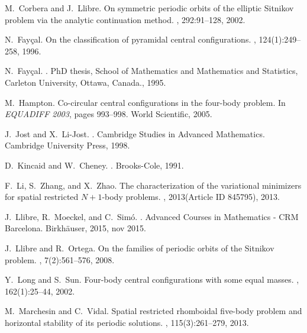 \documentclass[smallcondensed]{svjour3}
\begin{document}
\begin{thebibliography}{10}
M.~Corbera and J.~Llibre.
\newblock On symmetric periodic orbits of the elliptic {S}itnikov problem via
  the analytic continuation method.
, 292:91--128, 2002.

N.~Fay{\c{c}}al.
\newblock On the classification of pyramidal central configurations.
,
  124(1):249--258, 1996.

N.~Fay\c{c}al.
.
\newblock PhD thesis, School of Mathematics and Mathematics and Statistics,
  Carleton University, Ottawa, Canada., 1995.

M.~Hampton.
\newblock Co-circular central configurations in the four-body problem.
\newblock In {\em EQUADIFF 2003}, pages 993--998. World Scientific, 2005.

J.~Jost and X.~Li-Jost.
.
\newblock Cambridge Studies in Advanced Mathematics. Cambridge University
  Press, 1998.

D.~Kincaid and W.~Cheney.
.
\newblock Brooks-Cole, 1991.

F.~Li, S.~Zhang, and X.~Zhao.
\newblock The characterization of the variational minimizers for spatial
  restricted ${N}+1$-body problems.
, 2013(Article ID 845795), 2013.

J.~Llibre, R.~Moeckel, and C.~Sim\'o.
.
\newblock Advanced Courses in Mathematics - CRM Barcelona. Birkh{\"{a}}user,
  2015, nov 2015.

J.~Llibre and R.~Ortega.
\newblock On the families of periodic orbits of the {S}itnikov problem.
, 7(2):561--576, 2008.

Y.~Long and S.~Sun.
\newblock Four-body central configurations with some equal masses.
, 162(1):25--44,
  2002.

M.~Marchesin and C.~Vidal.
\newblock Spatial restricted rhomboidal five-body problem and horizontal
  stability of its periodic solutions.
, 115(3):261--279,
  2013.


\end{thebibliography}
\end{document}

